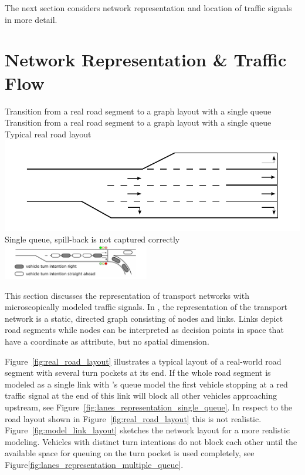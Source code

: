 The next section considers network representation and location of traffic signals in more detail. 

\section{Network Representation \& Traffic Flow}
\label{sec:signals_network_traffic_flow}

\createfigure%
{Transition from a real road segment to a graph layout with a single queue}%
{Transition from a real road segment to a graph layout with a single queue}
{\label{fig:combined_model}}
{%
  \createsubfigure%
	{Typical real road layout}
	{\includegraphics[width=0.475\linewidth]{extending/figures/signalslanes/real_road_layout.pdf}}
	{\label{fig:real_road_layout}}
  \createsubfigure%
	{Single queue, spill-back is not captured correctly}%
	{\includegraphics[width=0.48\textwidth]{extending/figures/signalslanes/single_queue_model_inkscape.pdf}}%
	{\label{fig:lanes_representation_single_queue}}%
}%
{\citet{Grether2014PhD}}

This section discusses the representation of transport networks with microscopically modeled traffic signals. 
In , the representation of the transport network is a static, directed graph consisting of nodes and links. 
Links depict road segments while nodes can be interpreted as decision points in space that have a coordinate as attribute, but no spatial dimension. 

Figure~\ref{fig:real_road_layout} illustrates a typical layout of a real-world road segment with several turn pockets at its end. 
If the whole road segment is modeled as a single link with 's queue model the first vehicle stopping at a red traffic signal at the end of this link will block all other vehicles approaching upstream, see Figure~\ref{fig:lanes_representation_single_queue}. 
In respect to the road layout shown in Figure~\ref{fig:real_road_layout} this is not realistic. 
Figure~\ref{fig:model_link_layout} sketches the network layout for a more realistic modeling. 
Vehicles with distinct turn intentions do not block each other until the available space for queuing on the turn pocket is used completely, see Figure\ref{fig:lanes_representation_multiple_queue}. 

